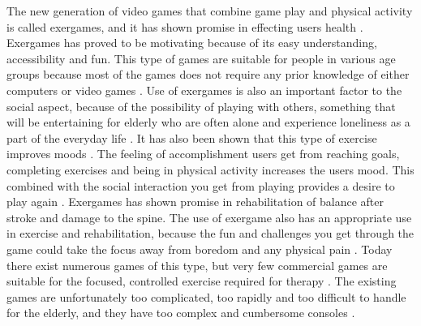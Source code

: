 The new generation of video games that combine game play and physical activity is called exergames, and it has shown promise in effecting users health \cite{promotingexercise}. Exergames has proved to be motivating because of its easy understanding, accessibility and fun. This type of games are suitable for people in various age groups because most of the games does not require any prior knowledge of either computers or video games \cite{garcia2012exergames}. Use of exergames is also an important factor to the social aspect, because of the possibility of playing with others, something that will be entertaining for elderly who are often alone and experience loneliness as a part of the everyday life \cite{exergamesforelderly}. It has also been shown that this type of exercise improves moods \cite{staiano2011exergames}. The feeling of accomplishment users get from reaching goals, completing exercises and being in physical activity increases the users mood. This combined with the social interaction you get from playing provides a desire to play again \cite{exergamesforelderly} \cite{staiano2011exergames}. Exergames has shown promise in rehabilitation of balance after stroke and damage to the spine. The use of exergame also has an appropriate use in exercise and rehabilitation, because the fun and challenges you get through the game could take the focus away from boredom and any physical pain \cite{exergamesforelderly} \cite{lange2011development}. Today there exist numerous games of this type, but very few commercial games are suitable for the focused, controlled exercise required for therapy \cite{lange2011development}. The existing games are unfortunately too complicated, too rapidly and too difficult to handle for the elderly, and they have too complex and cumbersome consoles \cite{exergamesforelderly}. 

